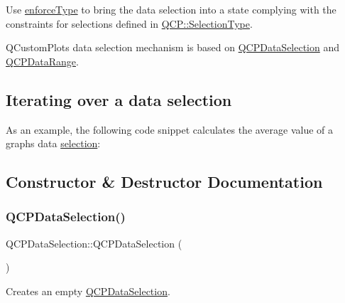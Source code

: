 Use \mbox{\hyperlink{class_q_c_p_data_selection_a17b84d852911531d229f4a76aa239a75}{enforce\+Type}} to bring the data selection into a state complying with the constraints for selections defined in \mbox{\hyperlink{namespace_q_c_p_ac6cb9db26a564b27feda362a438db038}{Q\+C\+P\+::\+Selection\+Type}}.

Q\+Custom\+Plot\textquotesingle{}s data selection mechanism is based on \mbox{\hyperlink{class_q_c_p_data_selection}{Q\+C\+P\+Data\+Selection}} and \mbox{\hyperlink{class_q_c_p_data_range}{Q\+C\+P\+Data\+Range}}.\hypertarget{class_q_c_p_data_selection_qcpdataselection-iterating}{}\subsection{Iterating over a data selection}\label{class_q_c_p_data_selection_qcpdataselection-iterating}
As an example, the following code snippet calculates the average value of a graph\textquotesingle{}s data \mbox{\hyperlink{class_q_c_p_abstract_plottable_a040bf09f41d456284cfd39cc37aa068f}{selection}}\+:


\begin{DoxyCodeInclude}{0}
\end{DoxyCodeInclude}


\subsection{Constructor \& Destructor Documentation}
\mbox{\label{class_q_c_p_data_selection_a0e0b7faaec7df1a7c77dd6f4883cdf0d}} 
\subsubsection{\texorpdfstring{QCPDataSelection()}{QCPDataSelection()}\hspace{0.1cm}{\footnotesize\ttfamily [1/2]}}
{\footnotesize\ttfamily Q\+C\+P\+Data\+Selection\+::\+Q\+C\+P\+Data\+Selection (\begin{DoxyParamCaption}{ }\end{DoxyParamCaption})\hspace{0.3cm}{\ttfamily [explicit]}}

Creates an empty \mbox{\hyperlink{class_q_c_p_data_selection}{Q\+C\+P\+Data\+Selection}}. \mbox{\label{class_q_c_p_data_selection_a738dfb4f5718c5df5ed35ea33ac37818}} 
